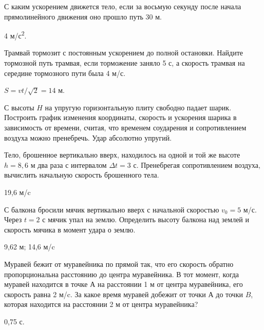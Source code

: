 \begin{ex} %
С каким ускорением движется тело, если за восьмую секунду после начала прямолинейного движения оно прошло путь 30 м.
\begin{ans}
4 м/с\textsuperscript{2}.
\end{ans}
\end{ex}

\begin{ex} %
Трамвай тормозит с постоянным ускорением до полной остановки. Найдите тормозной путь трамвая, если торможение заняло 5 с, а скорость трамвая на середине тормозного пути была 4 м/с.
\begin{ans}
$S = vt/\sqrt{2} = 14$ м.
\end{ans}
\end{ex}

\begin{ex} %
С высоты $H$ на упругую горизонтальную плиту свободно падает шарик. Построить график изменения координаты, скорость и ускорения шарика в зависимость от времени, считая, что временем соударения и сопротивлением воздуха можно пренебречь. Удар абсолютно упругий.
\begin{ans}
\end{ans}
\end{ex}

\begin{ex} %
Тело, брошенное вертикально вверх, находилось на одной и той же высоте $h = 8,6$ м два раза с интервалом $\Delta t = 3$ с. Пренебрегая сопротивлением воздуха, вычислить начальную скорость брошенного тела.
\begin{ans}
19,6 м/c
\end{ans}
\end{ex}

\begin{ex} %
С балкона бросили мячик вертикально вверх с начальной скоростью $v_0 = 5$ м/с. Через $t = 2$ с мячик упал на землю. Определить высоту балкона над землей и скорость мячика в момент удара о землю.
\begin{ans}
9,62 м; 14,6 м/c
\end{ans}
\end{ex}

\begin{ex} %
Муравей бежит от муравейника по прямой так, что его скорость обратно пропорциональна расстоянию до центра муравейника. В тот момент, когда муравей находится в точке $А$ на расстоянии 1 м от центра муравейника, его скорость равна 2 м/c. За какое время муравей добежит от точки А до точки $B$, которая находится на расстоянии 2 м от центра муравейника?
\begin{ans}
0,75 с.
\end{ans}
\end{ex}

\clearpage